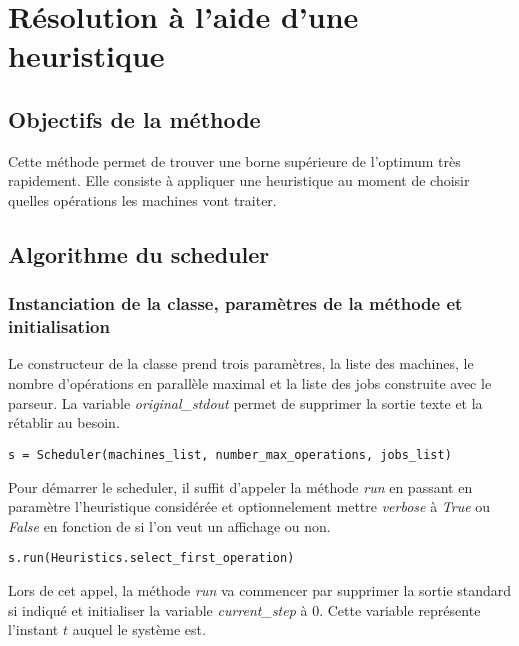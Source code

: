 \section{Résolution à l'aide d'une heuristique}

\subsection{Objectifs de la méthode}

Cette méthode permet de trouver une borne supérieure de l'optimum très rapidement. Elle consiste à appliquer une heuristique au moment de choisir quelles opérations les machines vont traiter.

\subsection{Algorithme du scheduler}

\subsubsection{Instanciation de la classe, paramètres de la méthode et initialisation}



Le constructeur de la classe prend trois paramètres, la liste des machines, le nombre d'opérations en parallèle maximal et la liste des jobs construite avec le parseur. La variable \textit{original\_stdout} permet de supprimer la sortie texte et la rétablir au besoin.

\begin{lstlisting}
s = Scheduler(machines_list, number_max_operations, jobs_list)
\end{lstlisting}

Pour démarrer le scheduler, il suffit d'appeler la méthode \textit{run} en passant en paramètre l'heuristique considérée et optionnelement mettre \textit{verbose} à \textit{True} ou \textit{False} en fonction de si l'on veut un affichage ou non.
\begin{lstlisting}
s.run(Heuristics.select_first_operation)
\end{lstlisting}

Lors de cet appel, la méthode \textit{run} va commencer par supprimer la sortie standard si indiqué et initialiser la variable \textit{current\_step} à $0$. Cette variable représente l'instant $t$ auquel le système est. 



